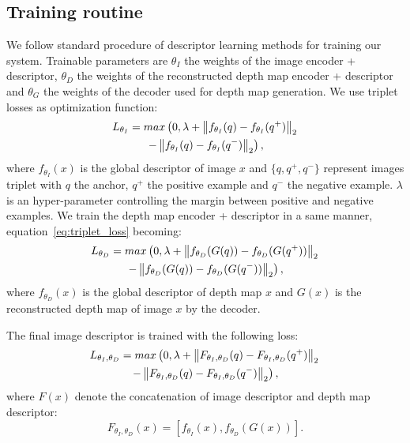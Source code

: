 \subsection{Training routine}
\label{subsec:training}
We follow standard procedure of descriptor learning methods for training our system. Trainable parameters are $\theta_{I}$ the weights of the image encoder + descriptor, $\theta_{D}$ the weights of the reconstructed depth map encoder + descriptor and $\theta_{G}$ the weights of the decoder used for depth map generation. We use triplet losses as optimization function:
\begin{multline}
	\label{eq:triplet_loss}
	L_{\theta_{I}} = max\left(0, \lambda + \left\lVert f_{\theta_{I}}(q) - f_{\theta_{I}}(q^+)\right\rVert_2  \right. \\	
	\left. - \left\lVert f_{\theta_{I}}(q) - f_{\theta_{I}}(q^-)\right\rVert_2 \right),
\end{multline}
where $f_{\theta_{I}}(x)$ is the global descriptor of image $x$ and $\{q, q^+, q^-\}$ represent images triplet with $q$ the anchor, $q^+$ the positive example and $q^-$ the negative example. $\lambda$ is an hyper-parameter controlling the margin between positive and negative examples. We train the depth map encoder + descriptor in a same manner, equation~\ref{eq:triplet_loss} becoming:
\begin{multline}
	\label{eq:depth_triplet_loss}
	L_{\theta_{D}}  = max\left(0, \lambda + \left\lVert f_{\theta_{D}}(G(q)) - f_{\theta_{D}}(G(q^+))\right\rVert_2  \right. \\	
	\left. - \left\lVert f_{\theta_{D}}(G(q)) - f_{\theta_{D}}(G(q^-))\right\rVert_2 \right),
\end{multline}
where $f_{\theta_{D}}(x)$ is the global descriptor of depth map $x$ and $G(x)$ is the reconstructed depth map of image $x$ by the decoder.

The final image descriptor is trained with the following loss:
\begin{multline}
	\label{eq:cat_triplet_loss}
	L_{\theta_{I},\theta_{D}} = max\left(0, \lambda + \left\lVert F_{\theta_{I},\theta_{D}}(q) - F_{\theta_{I},\theta_{D}}(q^+)\right\rVert_2  \right. \\	
	\left. - \left\lVert F_{\theta_{I},\theta_{D}}(q) - F_{\theta_{I},\theta_{D}}(q^-)\right\rVert_2 \right),
\end{multline}
where $F(x)$ denote the concatenation of image descriptor and depth map descriptor:
\begin{equation}
	\label{eq:cat_function}
	F_{\theta_{I},\theta_{D}}(x) = \left[ f_{\theta_{I}}(x), f_{\theta_{D}}(G(x)) \right].
\end{equation}

